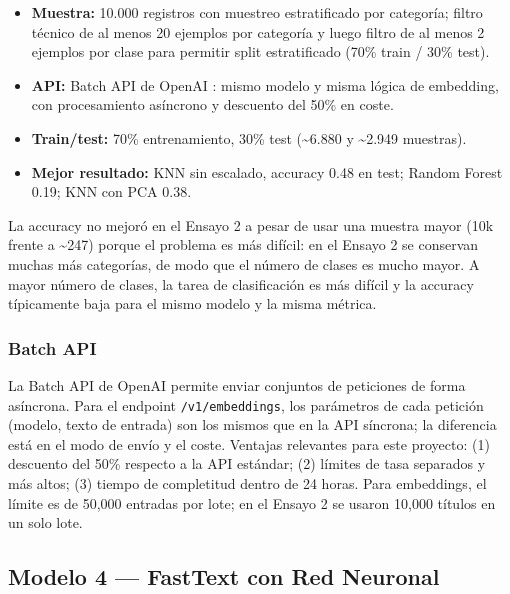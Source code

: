 \documentclass[11pt,a4paper]{article}
\begin{document}
\begin{itemize}
    \item \textbf{Muestra:} 10.000 registros con muestreo estratificado por categoría; filtro técnico de al menos 20 ejemplos por categoría y luego filtro de al menos 2 ejemplos por clase para permitir split estratificado (70\% train / 30\% test).
    \item \textbf{API:} Batch API de OpenAI \cite{openai-batch}: mismo modelo y misma lógica de embedding, con procesamiento asíncrono y descuento del 50\% en coste.
    \item \textbf{Train/test:} 70\% entrenamiento, 30\% test (\textasciitilde6.880 y \textasciitilde2.949 muestras).
    \item \textbf{Mejor resultado:} KNN sin escalado, accuracy 0.48 en test; Random Forest 0.19; KNN con PCA 0.38.
\end{itemize}

La accuracy no mejoró en el Ensayo 2 a pesar de usar una muestra mayor (10k frente a \textasciitilde247) porque el problema es más difícil: en el Ensayo 2 se conservan muchas más categorías, de modo que el número de clases es mucho mayor. A mayor número de clases, la tarea de clasificación es más difícil y la accuracy típicamente baja para el mismo modelo y la misma métrica.

\subsubsection{Batch API}

La Batch API de OpenAI \cite{openai-batch} permite enviar conjuntos de peticiones de forma asíncrona. Para el endpoint \texttt{/v1/embeddings}, los parámetros de cada petición (modelo, texto de entrada) son los mismos que en la API síncrona; la diferencia está en el modo de envío y el coste. Ventajas relevantes para este proyecto: (1) descuento del 50\% respecto a la API estándar; (2) límites de tasa separados y más altos; (3) tiempo de completitud dentro de 24 horas. Para embeddings, el límite es de 50,000 entradas por lote; en el Ensayo 2 se usaron 10,000 títulos en un solo lote.

\subsection{Modelo 4 --- FastText con Red Neuronal}
\end{document}
